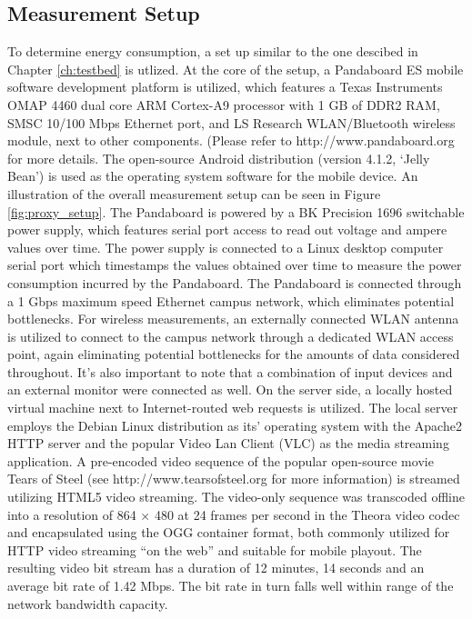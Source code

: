 \subsection*{Measurement Setup}
To determine energy consumption, a set up similar to the one descibed in Chapter \ref{ch:testbed} is utlized. At the core of the setup, a Pandaboard ES mobile
software development platform is utilized, which features a Texas Instruments OMAP 4460 dual core ARM Cortex-A9 processor with
1 GB of DDR2 RAM, SMSC 10/100 Mbps Ethernet port, and
LS Research WLAN/Bluetooth wireless module, next to other
components. (Please refer to http://www.pandaboard.org for
more details. The open-source Android distribution
(version 4.1.2, ‘Jelly Bean’)  is used as the operating system software for the mobile device.
An illustration of the overall measurement setup can be seen in Figure \ref{fig:proxy_setup}. The
Pandaboard is powered by a BK Precision 1696 switchable
power supply, which features serial port access to read out
voltage and ampere values over time. The power
supply is connected to a Linux desktop computer serial port which timestamps
the values obtained over time to measure the power consumption
incurred by the Pandaboard. The Pandaboard is connected
through a 1 Gbps maximum speed Ethernet campus network,
which eliminates potential bottlenecks. For wireless measurements,
an externally connected WLAN antenna is utilized to
connect to the campus network through a dedicated WLAN access point, again eliminating potential bottlenecks for the
amounts of data considered throughout. It's also important to note
that a combination of input devices and an external monitor
were connected as well.
On the server side, a locally hosted virtual
machine next to Internet-routed web requests is utilized. The local server employs the Debian Linux distribution as its' operating system
with the Apache2 HTTP server and the popular Video Lan
Client (VLC) as the media streaming application. A pre-encoded
video sequence of the popular open-source movie Tears
of Steel (see http://www.tearsofsteel.org for more information) is streamed utilizing HTML5 video streaming. The video-only sequence
was transcoded offline into a resolution of 864 × 480 at 24
frames per second in the Theora video codec and encapsulated
using the OGG container format, both commonly utilized for
HTTP video streaming “on the web” and suitable for mobile
playout. The resulting video bit stream has a duration of 12
minutes, 14 seconds and an average bit rate of 1.42 Mbps.
The bit rate in turn falls well within range of the network
bandwidth capacity.


